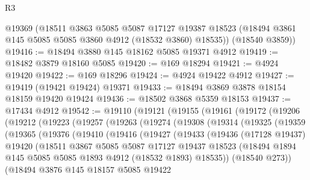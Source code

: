 \begin{lexlean}{R3}
\begin{coremodule}
      @19369
      (@18511
        @3863
        @5085
        @5087
        @17127
        @19387
        @18523
        (@18494 @3861 @145 @5085 @5085 @3860 @4912 (@18532 @3860) @18535))
      (@18540 @3859))
@19416 := @18494 @3880 @145 @18162 @5085 @19371 @4912
@19419 := @18482 @3879 @18160 @5085
@19420 := @169 @18294
@19421 := @4924 @19420
@19422 := @169 @18296
@19424 := @4924 @19422 @4912
@19427 := @19419 (@19421 @19424) @19371
@19433 := @18494 @3869 @3878 @18154 @18159 @19420 @19424
@19436 := @18502 @3868 @5359 @18153
@19437 := @17434 @4912
@19542 := @19110
    (@19121
      (@19155
        (@19161
          (@19172
            (@19206
              (@19212
                (@19223
                  (@19257
                    (@19263
                      (@19274
                        (@19308
                          (@19314
                            (@19325
                              (@19359
                                (@19365
                                  (@19376
                                    (@19410
                                      (@19416
                                        (@19427
                                          (@19433
                                            (@19436
                                              (@17128 @19437)
                                              @19420
                                              (@18511
                                                @3867
                                                @5085
                                                @5087
                                                @17127
                                                @19437
                                                @18523
                                                (@18494
                                                  @1894
                                                  @145
                                                  @5085
                                                  @5085
                                                  @1893
                                                  @4912
                                                  (@18532 @1893)
                                                  @18535))
                                              (@18540 @273))
                                            (@18494
                                              @3876
                                              @145
                                              @18157
                                              @5085
                                              @19422

\end{coremodule}
\end{lexlean}
